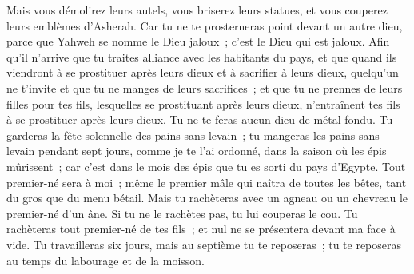 \begin{multicols}{2}
Mais vous démolirez leurs autels, vous briserez leurs statues, et vous couperez leurs emblèmes d'Asherah.
Car tu ne te prosterneras point devant un autre dieu, parce que Yahweh se nomme le Dieu jaloux~; c'est le Dieu qui est jaloux.
Afin qu'il n'arrive que tu traites alliance avec les habitants du pays, et que quand ils viendront à se prostituer après leurs dieux et à sacrifier à leurs dieux, quelqu'un ne t'invite et que tu ne manges de leurs sacrifices~;
et que tu ne prennes de leurs filles pour tes fils, lesquelles se prostituant après leurs dieux, n'entraînent tes fils à se prostituer après leurs dieux.
Tu ne te feras aucun dieu de métal fondu.
Tu garderas la fête solennelle des pains sans levain~; tu mangeras les pains sans levain pendant sept jours, comme je te l'ai ordonné, dans la saison où les épis mûrissent~; car c'est dans le mois des épis que tu es sorti du pays d'Egypte.
Tout premier-né sera à moi~; même le premier mâle qui naîtra de toutes les bêtes, tant du gros que du menu bétail.
Mais tu rachèteras avec un agneau ou un chevreau le premier-né d'un âne. Si tu ne le rachètes pas, tu lui couperas le cou. Tu rachèteras tout premier-né de tes fils~; et nul ne se présentera devant ma face à vide.
Tu travailleras six jours, mais au septième tu te reposeras~; tu te reposeras au temps du labourage et de la moisson.

\end{multicols}

